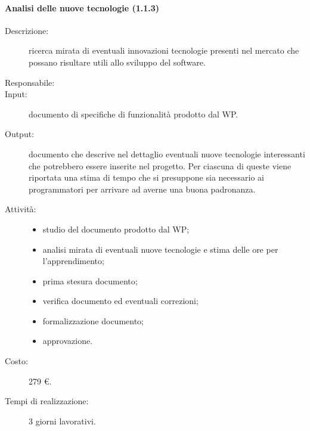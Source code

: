 \paragraph{Analisi delle nuove tecnologie (1.1.3)}
\begin{description}
\item[Descrizione:] ricerca mirata di eventuali innovazioni tecnologie presenti nel mercato che possano risultare utili allo sviluppo del software.
\item[Responsabile:]
\item[Input:] documento di specifiche di funzionalit\`{a} prodotto dal WP.
\item[Output:] documento che descrive nel dettaglio eventuali nuove tecnologie interessanti che potrebbero essere inserite nel progetto. Per ciascuna di queste viene riportata una stima di tempo che si presuppone sia necessario ai programmatori per arrivare ad averne una buona padronanza.
\item[Attivit\`{a}:] 
\begin{center}
\begin{itemize}
\item studio del documento prodotto dal WP;
\item analisi mirata di eventuali nuove tecnologie e stima delle ore per l'apprendimento;
\item prima stesura documento;
\item verifica documento ed eventuali correzioni;
\item formalizzazione documento;
\item approvazione.
\end{itemize}
\end{center}
\item[Costo:] 279 \euro{}.
\item[Tempi di realizzazione:] 3 giorni lavorativi.
\end{description}

